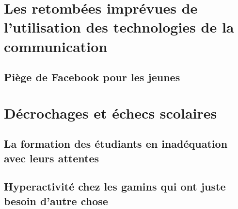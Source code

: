 \section{Les retombées imprévues de l'utilisation des technologies de la communication}

\subsection{Piège de Facebook pour les jeunes}



\section{Décrochages et échecs scolaires}
\subsection{La formation des étudiants en inadéquation avec leurs attentes}


\subsection{Hyperactivité chez les gamins qui ont juste besoin d'autre chose}

